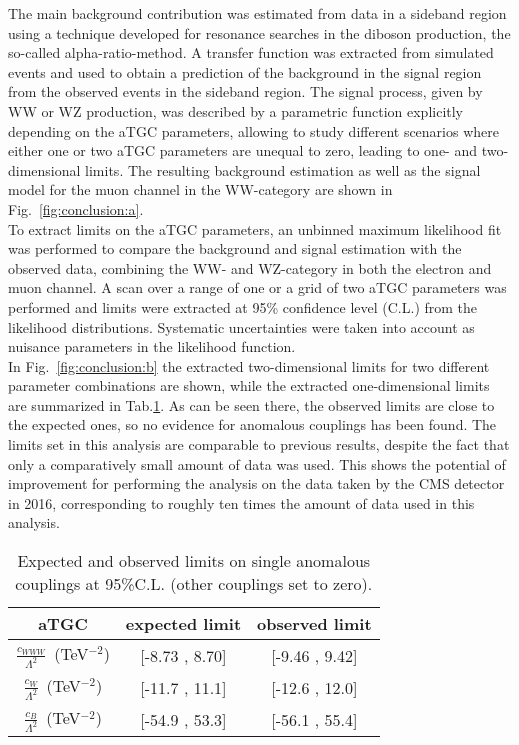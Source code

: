 The main background contribution was estimated from data in a sideband region using a technique developed for resonance searches in the diboson production, the so-called alpha-ratio-method. A transfer function was extracted from simulated events and used to obtain a prediction of the background in the signal region from the observed events in the sideband region. The signal process, given by WW or WZ production, was described by a parametric function explicitly depending on the aTGC parameters, allowing to study different scenarios where either one or two aTGC parameters are unequal to zero, leading to one- and two-dimensional limits. The resulting background estimation as well as the signal model for the muon channel in the WW-category are shown in Fig.~\ref{fig:conclusion:a}.\\

To extract limits on the aTGC parameters, an unbinned maximum likelihood fit was performed to compare the background and signal estimation with the observed data, combining the WW- and WZ-category in both the electron and muon channel. A scan over a range of one or a grid of two aTGC parameters was performed and limits were extracted at 95\% confidence level (C.L.) from the likelihood distributions. Systematic uncertainties were taken into account as nuisance parameters in the likelihood function.\\

In Fig.~\ref{fig:conclusion:b} the extracted two-dimensional limits for two different parameter combinations are shown, while the extracted one-dimensional limits are summarized in Tab.\ref{tab:conclusion:1d}. As can be seen there, the observed limits are close to the expected ones, so no evidence for anomalous couplings has been found. The limits set in this analysis are comparable to previous results, despite the fact that only a comparatively small amount of data was used. This shows the potential of improvement for performing the analysis on the data taken by the CMS detector in 2016, corresponding to roughly ten times the amount of data used in this analysis.

\begin{table}
	\centering
	\caption[Expected and observed limits on single anomalous couplings at 95\%C.L.]{Expected and observed limits on single anomalous couplings at 95\%C.L. (other couplings set to zero).}
	\label{tab:conclusion:1d}
	\begin{tabular}{ccc}
	\hline
	aTGC              &     expected limit & observed limit\\
	\hline
	$\frac{c_{WWW}}{\Lambda ^2}$~(TeV$^{-2}$) &  [-8.73 , 8.70] &  [-9.46 , 9.42] \\
	$\frac{c_{W}}{\Lambda ^2}$~(TeV$^{-2}$)   &  [-11.7 , 11.1] &  [-12.6 , 12.0] \\
	$\frac{c_{B}}{\Lambda ^2}$~(TeV$^{-2}$)   & [-54.9 , 53.3] &  [-56.1 , 55.4] \\
	\hline
	\end{tabular}
\end{table}

